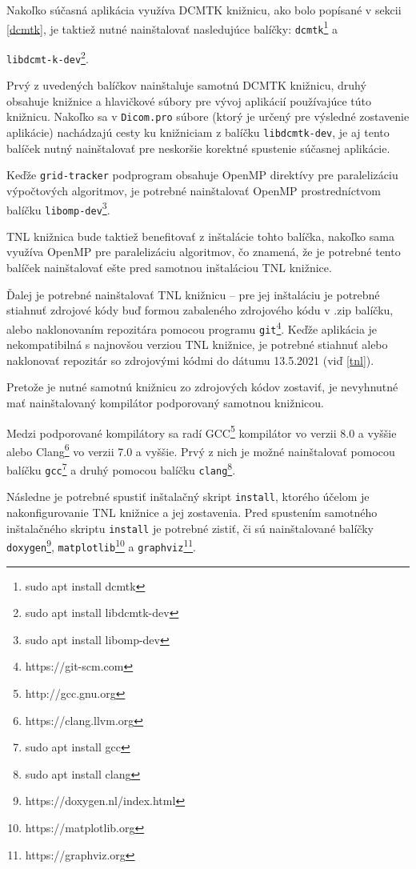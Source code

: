 Nakoľko súčasná aplikácia využíva DCMTK knižnicu, ako bolo popísané v sekcii \ref{dcmtk}, je taktiež nutné nainštalovať nasledujúce balíčky: \texttt{dcmtk}\footnote{sudo apt install dcmtk} a {\texttt{libdcmt-\newline k-dev}\footnote{sudo apt install libdcmtk-dev}.

Prvý z uvedených balíčkov nainštaluje samotnú DCMTK knižnicu, druhý obsahuje knižnice a hlavičkové súbory pre vývoj aplikácií používajúce túto knižnicu. Nakoľko sa v \texttt{Dicom.pro} súbore (ktorý je určený pre výsledné zostavenie aplikácie) nachádzajú cesty ku knižniciam z balíčku \texttt{libdcmtk-dev}, je aj tento balíček nutný nainštalovať pre neskoršie korektné spustenie súčasnej aplikácie.

Keďže \texttt{grid-tracker} podprogram obsahuje OpenMP direktívy pre paralelizáciu výpočtových algoritmov, je potrebné nainštalovať OpenMP prostredníctvom balíčku \texttt{libomp-dev}\footnote{sudo apt install libomp-dev}.

\clearpage
TNL knižnica bude taktiež benefitovať z inštalácie tohto balíčka, nakoľko sama využíva OpenMP pre paralelizáciu algoritmov, čo znamená, že je potrebné tento balíček nainštalovať ešte pred samotnou inštaláciou TNL knižnice.

Ďalej je potrebné nainštalovať TNL knižnicu -- pre jej inštaláciu je potrebné stiahnuť zdrojové kódy buď formou zabaleného zdrojového kódu v .zip balíčku, alebo naklonovaním repozitára pomocou programu \texttt{git}\footnote{https://git-scm.com}. Keďže aplikácia je nekompatibilná s najnovšou verziou TNL knižnice, je potrebné stiahnuť alebo naklonovať repozitár so zdrojovými kódmi do dátumu 13.5.2021 (viď \ref{tnl}).

Pretože je nutné samotnú knižnicu zo zdrojových kódov zostaviť, je nevyhnutné mať nainštalovaný kompilátor podporovaný samotnou knižnicou.

Medzi podporované kompilátory sa radí GCC\footnote{http://gcc.gnu.org} kompilátor vo verzii 8.0 a vyššie alebo Clang\footnote{https://clang.llvm.org} vo verzii 7.0 a vyššie. Prvý z nich je možné nainštalovať pomocou balíčku \texttt{gcc}\footnote{sudo apt install gcc} a druhý pomocou balíčku \texttt{clang}\footnote{sudo apt install clang}.

Následne je potrebné spustiť inštalačný skript \texttt{install}, ktorého účelom je nakonfigurovanie TNL knižnice a jej zostavenia.
Pred spustením samotného inštalačného skriptu \texttt{install} je potrebné zistiť, či sú nainštalované balíčky \texttt{doxygen}\footnote{https://doxygen.nl/index.html}, \texttt{matplotlib}\footnote{https://matplotlib.org} a \texttt{graphviz}\footnote{https://graphviz.org}.

}
